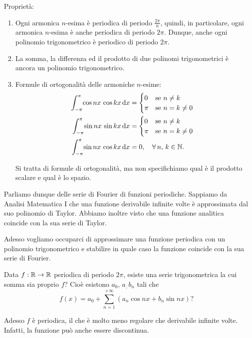 \documentclass[../../analisi2]{subfiles}
\begin{document}
        Proprietà:
        \begin{enumerate}
            \item Ogni armonica \(n\)-esima è periodica di periodo \(\frac{2 \pi}{n}\), quindi, in particolare, ogni armonica \(n\)-esima
                è anche periodica di periodo \(2\pi\). Dunque, anche ogni polinomio trigonometrico è periodico di periodo \(2\pi\).
            \item La somma, la differenza ed il prodotto di due polinomi trigonometrici è ancora un polinomio trigonometrico.
            \item Formule di ortogonalità delle armoniche \(n\)-esime:
                \begin{align*}
                    \int_{-\pi}^{\pi} \! \cos nx \, \cos kx \, \mathrm{d}x &=
                        \begin{cases}
                            0 & \text{se } n \neq k\\
                            \pi & \text{se } n = k \neq 0
                        \end{cases}\\
                    \int_{-\pi}^{\pi} \! \sin nx \, \sin kx \, \mathrm{d}x &=
                        \begin{cases}
                            0 & \text{se } n \neq k\\
                            \pi & \text{se } n = k \neq 0
                        \end{cases}\\
                    \int_{-\pi}^{\pi} \! \sin nx \, \cos kx \, \mathrm{d}x &= 0, \quad \forall \, n, \, k \in \mathbb{N}.
                \end{align*}
                \begin{osservazione}
                    Si tratta di formule di ortogonalità, ma non specifichiamo qual è il prodotto scalare e qual è lo spazio.
                \end{osservazione}
        \end{enumerate}

        Parliamo dunque delle serie di Fourier di funzioni periodiche. Sappiamo da Analisi Matematica I che una funzione derivabile
        infinite volte è approssimata dal suo polinomio di Taylor. Abbiamo inoltre visto che una funzione analitica coincide con la sua
        serie di Taylor.

        Adesso vogliamo occuparci di approssimare una funzione periodica con un polinomio trigonometrico e stabilire in quale caso la
        funzione coincide con la sua serie di Fourier.

        Data \(f : \mathbb{R} \to \mathbb{R}\) periodica di periodo \(2\pi\), esiste una serie trigonometrica la cui somma sia proprio \(f\)? Cioè
        esistono \(a_0, \, a_, \, b_n\) tali che
        \[
            f(x) = a_0 + \sum_{n = 1}^{+\infty} \left(a_n \cos nx + b_n \sin nx\right)?
        \]

        \begin{osservazione}
            Adesso \(f\) è periodica, il che è molto meno regolare che derivabile infinite volte. Infatti, la funzione può anche essere
            discontinua.
        \end{osservazione}
\end{document}
